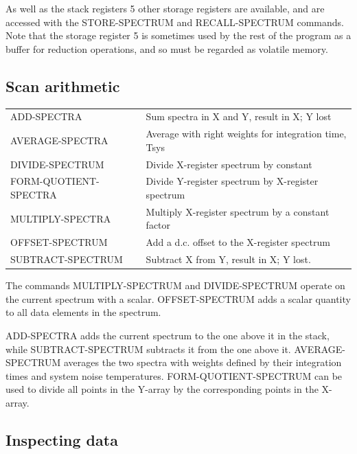 \documentclass[11pt,twoside]{report}
\begin{document}
As well as the stack registers 5 other storage registers are available, and are accessed with the STORE-SPECTRUM and
RECALL-SPECTRUM commands. Note that the storage register 5 is sometimes used by
the rest of the program as a buffer for reduction operations, and so must be
regarded as volatile memory.

\subsection{Scan arithmetic}

\begin{tabular}{ll}
ADD-SPECTRA              & Sum spectra in X and Y, result in X; Y lost\\
AVERAGE-SPECTRA          & Average with right weights for integration time, Tsys\\
DIVIDE-SPECTRUM          & Divide X-register spectrum by constant\\
FORM-QUOTIENT-SPECTRA    & Divide Y-register spectrum by X-register spectrum\\
MULTIPLY-SPECTRA         & Multiply X-register spectrum by a constant factor\\
OFFSET-SPECTRUM          & Add a d.c. offset to the X-register spectrum\\
SUBTRACT-SPECTRUM         & Subtract X from Y, result in X; Y lost.\\
\end{tabular}


The commands MULTIPLY-SPECTRUM and DIVIDE-SPECTRUM operate on the current
spectrum with a scalar. OFFSET-SPECTRUM adds a scalar quantity to all
data elements in the spectrum.

ADD-SPECTRA adds the current spectrum to the one above it in the stack,
while SUBTRACT-SPECTRUM subtracts it from the one above it. AVERAGE-SPECTRUM
averages the two spectra with weights defined by their integration times
and system noise temperatures. FORM-QUOTIENT-SPECTRUM can be used to
divide all points in the Y-array by the corresponding points in the X-array.

\subsection{Inspecting data}
\end{document}
